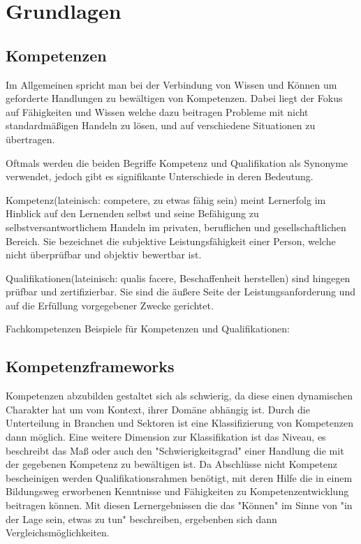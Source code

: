 \section{Grundlagen}\label{2_grundlagen}


\subsection{Kompetenzen}\label{competencies}

Im Allgemeinen spricht man bei der Verbindung von Wissen und Können um geforderte Handlungen zu bewältigen von Kompetenzen. Dabei liegt der Fokus auf Fähigkeiten und Wissen welche dazu beitragen Probleme mit nicht standardmäßigen Handeln zu lösen, und auf verschiedene Situationen zu übertragen.\cite{bibb}

Oftmals werden die beiden Begriffe Kompetenz und Qualifikation als Synonyme verwendet, jedoch gibt es signifikante Unterschiede in deren Bedeutung. 
\vspace{1em}
 
Kompetenz(lateinisch: competere, zu etwas fähig sein) meint Lernerfolg im Hinblick auf den Lernenden selbst und seine Befähigung zu selbstversantwortlichem Handeln im privaten, beruflichen und gesellschaftlichen Bereich. Sie bezeichnet die subjektive Leistungsfähigkeit einer Person, welche nicht überprüfbar und objektiv bewertbar ist.

Qualifikationen(lateinisch: qualis facere, Beschaffenheit herstellen) sind hingegen prüfbar und zertifizierbar. Sie sind die äußere Seite der Leistungsanforderung und auf die Erfüllung vorgegebener Zwecke gerichtet. 
 
Fachkompetenzen
Beispiele für Kompetenzen und Qualifikationen:

\subsection{Kompetenzframeworks}

Kompetenzen abzubilden gestaltet sich als schwierig, da diese einen dynamischen Charakter hat um vom Kontext, ihrer Domäne abhängig ist. Durch die Unterteilung in Branchen und Sektoren ist eine Klassifizierung von Kompetenzen dann möglich. Eine weitere Dimension zur Klassifikation ist das Niveau, es beschreibt das Maß oder auch den "Schwierigkeitsgrad" einer Handlung die mit der gegebenen Kompetenz zu bewältigen ist. 
\vspace{1em}
Da Abschlüsse nicht Kompetenz bescheinigen werden Qualifikationsrahmen benötigt, mit deren Hilfe die in einem Bildungsweg erworbenen Kenntnisse und Fähigkeiten zu Kompetenzentwicklung beitragen können. Mit diesen Lernergebnissen die das "Können" im Sinne von "in der Lage sein, etwas zu tun" beschreiben, ergebenben sich dann Vergleichsmöglichkeiten.

